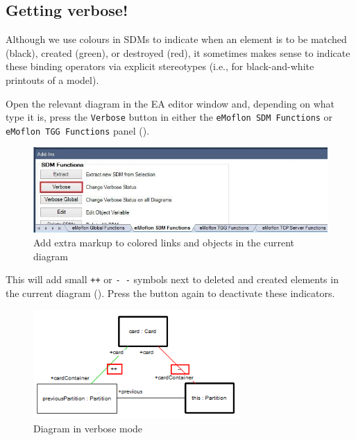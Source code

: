 \subsection{Getting verbose!}

Although we use colours in SDMs to indicate when an element is to be matched (black), created (green), or destroyed (red), it sometimes makes sense to
indicate these binding operators via explicit stereotypes (i.e., for black-and-white printouts of a model).

\begin{stepbystep}
  
\item Open the relevant diagram in the EA editor window and, depending on what type it is, press the \texttt{Verbose} button in
either the \texttt{eMoflon SDM Functions} or \texttt{eMoflon TGG Functions} panel ().

\vspace{0.5cm}

\begin{figure}[htbp]
\begin{center}
  \includegraphics[width=\textwidth]{ea_changeVerboseStatus}
  \caption{Add extra markup to colored links and objects in the current diagram}  
  \label{ea:changeVStatus}
\end{center}
\end{figure}

\item This will add small \texttt{++} or \texttt{-~-} symbols next to deleted and created elements in the current diagram
(). Press the button again to deactivate these indicators.

\begin{figure}[htbp]
\begin{center}
  \includegraphics[width=0.7\textwidth]{ea_verboseSymbols}
  \caption{Diagram in verbose mode}  
  \label{ea:verboseSymbols}
\end{center}
\end{figure}

\end{stepbystep}
